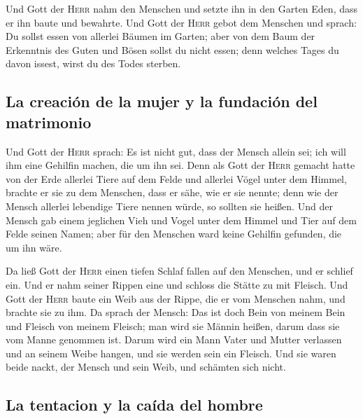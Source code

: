  Und Gott der \textsc{Herr} nahm den Menschen und setzte
ihn in den Garten Eden, dass er ihn baute und bewahrte. 
Und Gott der \textsc{Herr} gebot dem Menschen und sprach: Du sollst
essen von allerlei Bäumen im Garten;  aber von dem Baum
der Erkenntnis des Guten und Bösen sollst du nicht essen; denn welches
Tages du davon issest, wirst du des Todes sterben.

\hypertarget{la-creaciuxf3n-de-la-mujer-y-la-fundaciuxf3n-del-matrimonio}{%
\subsection{La creación de la mujer y la fundación del
matrimonio}\label{la-creaciuxf3n-de-la-mujer-y-la-fundaciuxf3n-del-matrimonio}}

 Und Gott der \textsc{Herr} sprach: Es ist nicht gut,
dass der Mensch allein sei; ich will ihm eine Gehilfin machen, die um
ihn sei.  Denn als Gott der \textsc{Herr} gemacht hatte
von der Erde allerlei Tiere auf dem Felde und allerlei Vögel unter dem
Himmel, brachte er sie zu dem Menschen, dass er sähe, wie er sie nennte;
denn wie der Mensch allerlei lebendige Tiere nennen würde, so sollten
sie heißen.  Und der Mensch gab einem jeglichen Vieh und
Vogel unter dem Himmel und Tier auf dem Felde seinen Namen; aber für den
Menschen ward keine Gehilfin gefunden, die um ihn wäre.

 Da ließ Gott der \textsc{Herr} einen tiefen Schlaf
fallen auf den Menschen, und er schlief ein. Und er nahm seiner Rippen
eine und schloss die Stätte zu mit Fleisch.  Und Gott der
\textsc{Herr} baute ein Weib aus der Rippe, die er vom Menschen nahm,
und brachte sie zu ihm.  Da sprach der Mensch: Das ist
doch Bein von meinem Bein und Fleisch von meinem Fleisch; man wird sie
Männin heißen, darum dass sie vom Manne genommen ist. 
Darum wird ein Mann Vater und Mutter verlassen und an seinem Weibe
hangen, und sie werden sein ein Fleisch.  Und sie waren
beide nackt, der Mensch und sein Weib, und schämten sich nicht.

\hypertarget{la-tentacion-y-la-cauxedda-del-hombre}{%
\subsection{La tentacion y la caída del
hombre}\label{la-tentacion-y-la-cauxedda-del-hombre}}

